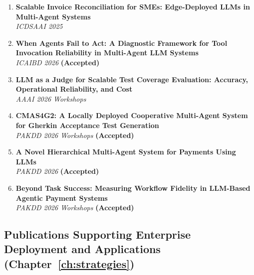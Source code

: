 \begin{enumerate}[leftmargin=*,resume]
    \item \textbf{Scalable Invoice Reconciliation for SMEs: Edge-Deployed LLMs in Multi-Agent Systems}~\cite{huang2025invoice}\\
    \textit{ICDSAAI 2025}
    
    \item \textbf{When Agents Fail to Act: A Diagnostic Framework for Tool Invocation Reliability in Multi-Agent LLM Systems}~\cite{huang2026when}\\
    \textit{ICAIBD 2026} \textbf{(Accepted)}
    
    \item \textbf{LLM as a Judge for Scalable Test Coverage Evaluation: Accuracy, Operational Reliability, and Cost}~\cite{huang2026judge}\\
    \textit{AAAI 2026 Workshops}

    \item \textbf{CMAS4G2: A Locally Deployed Cooperative Multi-Agent System for Gherkin Acceptance Test Generation}~\cite{huang2026cmas4g2}\\
    \textit{PAKDD 2026 Workshops} \textbf{(Accepted)}

    \item \textbf{A Novel Hierarchical Multi-Agent System for Payments Using LLMs}~\cite{huang2026hmasp}\\
    \textit{PAKDD 2026} \textbf{(Accepted)}

    \item \textbf{Beyond Task Success: Measuring Workflow Fidelity in LLM-Based Agentic Payment Systems}~\cite{huang2026asr}\\
    \textit{PAKDD 2026 Workshops} \textbf{(Accepted)}
    

\end{enumerate}

\subsection{Publications Supporting Enterprise Deployment and Applications (Chapter~\ref{ch:strategies})}

